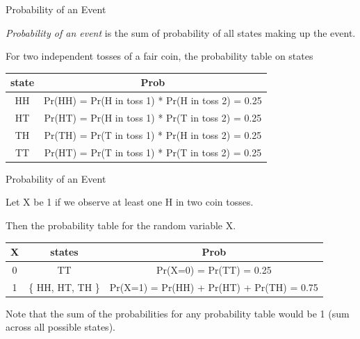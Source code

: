 \documentclass{beamer}\usepackage[]{graphicx}\usepackage[]{color}
\begin{document}
\begin{frame}[fragile]{Probability  of an Event \;\;}

\emph{Probability of an event} is the sum of probability of all states making up the event. \pause \newline

For two independent tosses of a fair coin, the probability table on states \pause \newline

\begin{tabular}{|c|c|}
\hline
state & Prob \\ \hline
HH & Pr(HH) = Pr(H in toss 1) * Pr(H in toss 2) = 0.25\\ \hline
HT & Pr(HT) = Pr(H in toss 1) * Pr(T in toss 2) = 0.25 \\ \hline
TH & Pr(TH) = Pr(T in toss 1) * Pr(H in toss 2) = 0.25\\ \hline
TT & Pr(HT) = Pr(T in toss 1) * Pr(T in toss 2) = 0.25 \\ \hline
\end{tabular} \pause \newline

\end{frame}

\begin{frame}[fragile]{Probability  of an Event \;\;}

Let X be 1 if we observe at least one H in two coin tosses. \pause \newline

Then the probability table for the random variable X. \newline

\begin{tabular}{|c|c|c|}
\hline
X & states & Prob \\ \hline
0 & TT & Pr(X=0) = Pr(TT) = 0.25 \\ \hline
1 & \{ HH, HT, TH \} & Pr(X=1) = Pr(HH) + Pr(HT) + Pr(TH) = 0.75 \\ \hline
\end{tabular} \newline \newline

Note that the sum of the probabilities for any probability table would be 1 (sum across all possible states).

\end{frame}
\end{document}
